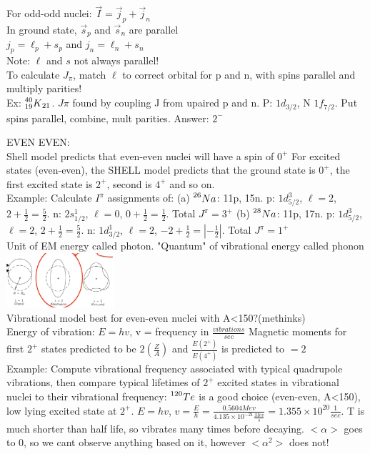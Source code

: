 \documentclass{article}
\begin{document}
\begin{multicols}{3}
For odd-odd nuclei: $\vec{I} = \vec{j}_{p} + \vec{j}_{n}$\\
In ground state, $\vec{s}_{p}$ and $\vec{s}_{n}$ are parallel\\
$j_{p} = \ell_{p} + s_{p}$ and $j_{n} = \ell_{n} + s_{n}$\\
Note: $\ell$ and $s$ not always parallel!\\
To calculate $J_{\pi}$, match $\ell$ to correct orbital for p and n, with spins parallel and multiply parities!\\
Ex: $\prescript{40}{19}{K}_{21}$.  $J\pi$ found by coupling J from upaired p and n.  P: $1d_{3/2}$, N $1f_{7/2}$.  Put spins parallel, combine, mult parities.  Answer: $2^{-}$


EVEN EVEN:\\
Shell model predicts that even-even nuclei will have a spin of $0^{+}$
For excited states (even-even), the SHELL model predicts that the ground state is $0^{+}$, the first excited state is $2^{+}$, second is $4^{+}$ and so on.\\
\hspace*{0.01\textwidth} Example: Calculate $I^{\pi}$ assignments of: (a) $ \prescript{26}{}{Na} $: 11p, 15n.  p: $1d_{5/2}^{3}$, $\ell = 2$, $2 + \frac{1}{2} = \frac{5}{2}$. n: $2s_{1/2}^{1}$, $\ell = 0$, $0 + \frac{1}{2} = \frac{1}{2	}$.  Total $J^{\pi} = 3^{+}$ (b)  $ \prescript{28}{}{Na} $: 11p, 17n.  p: $1d_{5/2}^{3}$, $\ell = 2$, $2 + \frac{1}{2} = \frac{5}{2}$. n: $1d_{3/2}^{1}$, $\ell = 2$, $-2 + \frac{1}{2} = |-\frac{1}{2}|$.  Total $J^{\pi} = 1^{+}$ \\

Unit of EM energy called photon.  "Quantum" of vibrational energy called phonon\\
\includegraphics[width=4cm]{images/vibrations.jpg}\\
Vibrational model best for even-even nuclei with A<150?(methinks)\\
Energy of vibration: $E = hv$, v = frequency in $\frac{vibrations}{sec}$
Magnetic moments for first $2^{+}$ states predicted to be $2(\frac{Z}{A})$ and $\frac{E(2^{+})}{E(4^{+})}$ is predicted to $=2$ \\
Example:  Compute vibrational frequency associated with typical quadrupole vibrations, then compare typical lifetimes of $2^{+}$ excited states in vibrational nuclei to their vibrational frequency:  $\prescript{120}{}{Te}$ is a good choice (even-even, A<150), low lying excited state at $2^{+}$.  $E = hv$, $v = \frac{E}{h} = \frac{0.5604Mev}{4.135\times10^{-21}\frac{Mev}{s}} = 1.355\times10^{20}\frac{1}{sec}$.  T is much shorter than half life, so vibrates many times before decaying. $<\alpha>$ goes to 0, so we cant observe anything based on it, however $<\alpha^{2}>$ does not!


\end{multicols}
\end{document}
